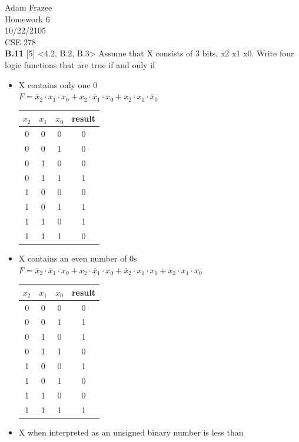 \documentclass{article}
\begin{document}
\noindent Adam Frazee \\
Homework 6 \\
10/22/2105 \\
CSE 278 \\

\noindent \textbf{B.11} [5] <4.2, B.2, B.3> Assume that X consists of 3 bits, x2 x1 x0. Write four logic functions that are true if and only if 
\begin{itemize}
	\item X contains only one 0 \\
	$F=\overline{x}_2 \cdot x_1 \cdot x_0 + x_2 \cdot \overline{x}_1 \cdot x_0 + x_2 \cdot x_1 \cdot \overline{x}_0$
	\\ \begin{tabular}{|c|c|c|c|}
	\hline
	$x_2$ & $x_1$ & $x_0$ & result \\ \hline
	0 & 0 & 0 & 0 \\ \hline
	0 & 0 & 1 & 0 \\ \hline
	0 & 1 & 0 & 0 \\ \hline
	0 & 1 & 1 & 1 \\ \hline
	1 & 0 & 0 & 0 \\ \hline
	1 & 0 & 1 & 1 \\ \hline
	1 & 1 & 0 & 1 \\ \hline
	1 & 1 & 1 & 0 \\ \hline
	\end{tabular}
	\item X contains an  even number of 0s \\
		$F=\overline{x}_2 \cdot \overline{x}_1 \cdot x_0 + x_2 \cdot \overline{x}_1 \cdot x_0 + \overline{x}_2 \cdot x_1 \cdot x_0+ x_2 \cdot x_1 \cdot x_0$
	\\ \begin{tabular}{|c|c|c|c|}
	\hline
	$x_2$ & $x_1$ & $x_0$ & result \\ \hline
	0 & 0 & 0 & 0 \\ \hline
	0 & 0 & 1 & 1 \\ \hline
	0 & 1 & 0 & 1 \\ \hline
	0 & 1 & 1 & 0 \\ \hline
	1 & 0 & 0 & 1 \\ \hline
	1 & 0 & 1 & 0 \\ \hline
	1 & 1 & 0 & 0 \\ \hline
	1 & 1 & 1 & 1 \\ \hline
	\end{tabular}
	\item  X when interpreted as an unsigned binary number is less than \\

\end{itemize}
\end{document}

